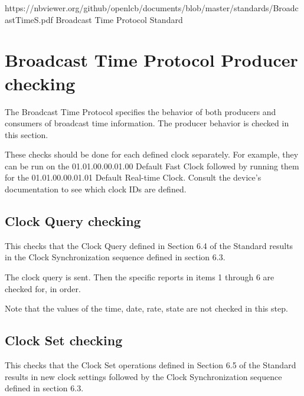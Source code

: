 



\maketitle
\thispagestyle{firststyle}

\introductionCaveats
    {https://nbviewer.org/github/openlcb/documents/blob/master/standards/BroadcastTimeS.pdf}
    {Broadcast Time Protocol Standard}

\section{Broadcast Time Protocol Producer checking}

The Broadcast Time Protocol specifies the behavior of both producers and consumers of 
broadcast time information.  
The producer behavior is checked in this section.

These checks should be done for each defined clock separately. 
For example, they can be run on the 01.01.00.00.01.00 Default Fast Clock
followed by running them for the 01.01.00.00.01.01 Default Real-time Clock.
Consult the device's documentation to see which clock IDs are defined.


\subsection{Clock Query checking}

This checks that the Clock Query defined in Section 6.4 of the Standard results in the
Clock Synchronization sequence defined in section 6.3.

The clock query is sent. 
Then the specific reports in items 1 through 6 are checked for, in order.

Note that the values of the time, date, rate, state are not checked in this step.

\subsection{Clock Set checking}

This checks that the Clock Set operations defined in Section 6.5 of the Standard results 
in new clock settings followed by the
Clock Synchronization sequence defined in section 6.3.

